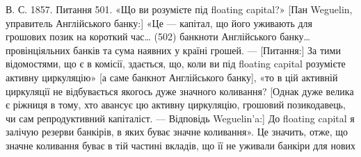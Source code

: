 В. С. 1857. Питання 501. «Що ви розумієте під floating capital?» [Пан
Weguelin, управитель Англійського банку:] «Це — капітал, що його уживають
для грошових позик на короткий час\dots{} (502) банкноти Англійського банку\dots{}
провінціяльних банків та сума наявних у країні грошей. — [Питання:] За тими
відомостями, що є в комісії, здається, що, коли ви під floating capital розумієте
активну циркуляцію» [а саме банкнот Англійського банку], «то в цій активній
циркуляції не відбувається якогось дуже значного коливання? [Однак дуже велика
є ріжниця в тому, хто авансує цю активну циркуляцію, грошовий позикодавець,
чи сам репродуктивний капіталіст. — Відповідь Weguelin’a:] До floating capital я
залічую резерви банкірів, в яких буває значне коливання». Це значить, отже, що
значне коливання буває в тій частині вкладів, що її не уживали банкіри для нових
\parbreak{}  %
